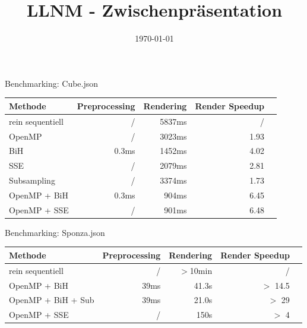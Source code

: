 


\title[LLNM]{LLNM - Zwischenpräsentation}
\subtitle{}
\date{\today}

	\begin{frame}
		\titlepage
	\end{frame}
	\begin{frame}{Benchmarking: Cube.json}
		\begin{tabular}{l*{4}{r}}
		Methode           & Preprocessing & Rendering & Render Speedup \\%
		\hline
		rein sequentiell  & /      & 5837ms & /      \\%
		OpenMP            & /      & 3023ms & 1.93   \\%
		BiH               & 0.3ms  & 1452ms & 4.02   \\%
		SSE               & /      & 2079ms & 2.81   \\%
		Subsampling       & /      & 3374ms & 1.73   \\%
		OpenMP + BiH      & 0.3ms  &  904ms & 6.45   \\%
		OpenMP + SSE      & /      &  901ms & 6.48   \\%
		\end{tabular}
	\end{frame}
	\begin{frame}{Benchmarking: Sponza.json}
		\begin{tabular}{l*{4}{r}}
		Methode           & Preprocessing & Rendering & Render Speedup \\%
		\hline
		rein sequentiell  & /      & $>$10min & /        \\
		OpenMP + BiH      & 39ms   & 41.3s    & $>$ 14.5 \\
		OpenMP + BiH + Sub  & 39ms   & 21.0s    & $>$ 29 \\
		OpenMP + SSE      & /      & 150s     & $>$ 4    \\
		\end{tabular}
	\end{frame}

